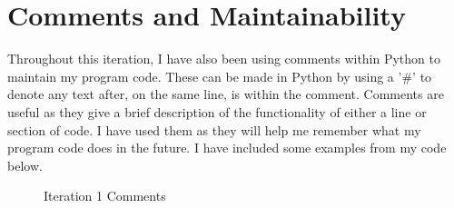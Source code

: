 \documentclass[12pt]{report}
\begin{document}
\pagebreak

\section{Comments and Maintainability}
Throughout this iteration, I have also been using comments within Python to maintain my program code. These can be made in Python by using a '\#' to denote any text after, on the same line, is within the comment. Comments are useful as they give a brief description of the functionality of either a line or section of code. I have used them as they will help me remember what my program code does in the future. I have included some examples from my code below.

\begin{figure}[H]
     \centering
    \caption{Iteration 1 Comments}
\end{figure}

\pagebreak
\end{document}
